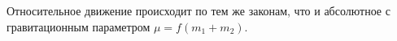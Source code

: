 Относительное движение происходит по тем же законам, что и  абсолютное
с гравитационным параметром
$\mu=f(m_1+m_2)$.
